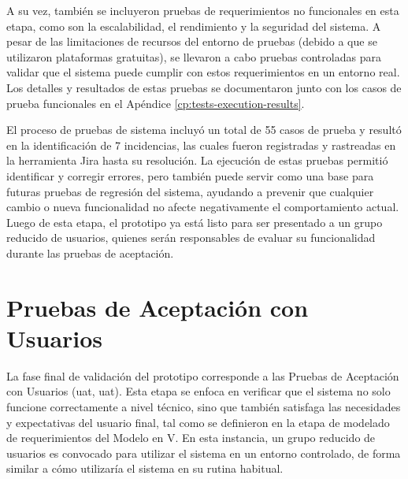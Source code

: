 A su vez, también se incluyeron pruebas de requerimientos no funcionales en esta etapa, como son la escalabilidad, el rendimiento y la seguridad del sistema. A pesar de las limitaciones de recursos del entorno de pruebas (debido a que se utilizaron plataformas gratuitas), se llevaron a cabo pruebas controladas para validar que el sistema puede cumplir con estos requerimientos en un entorno real. Los detalles y resultados de estas pruebas se documentaron junto con los casos de prueba funcionales en el Apéndice \ref{cp:tests-execution-results}.

El proceso de pruebas de sistema incluyó un total de 55 casos de prueba y resultó en la identificación de 7 incidencias, las cuales fueron registradas y rastreadas en la herramienta Jira hasta su resolución. La ejecución de estas pruebas permitió identificar y corregir errores, pero también puede servir como una base para futuras pruebas de regresión del sistema, ayudando a prevenir que cualquier cambio o nueva funcionalidad no afecte negativamente el comportamiento actual. Luego de esta etapa, el prototipo ya está listo para ser presentado a un grupo reducido de usuarios, quienes serán responsables de evaluar su funcionalidad durante las pruebas de aceptación.

\section{Pruebas de Aceptación con Usuarios}
\label{sec:user-acceptance-testing}

La fase final de validación del prototipo corresponde a las Pruebas de Aceptación con Usuarios (\acrshort{uat}, \acrlong{uat}). Esta etapa se enfoca en verificar que el sistema no solo funcione correctamente a nivel técnico, sino que también satisfaga las necesidades y expectativas del usuario final, tal como se definieron en la etapa de modelado de requerimientos del Modelo en V. En esta instancia, un grupo reducido de usuarios es convocado para utilizar el sistema en un entorno controlado, de forma similar a cómo utilizaría el sistema en su rutina habitual. 

